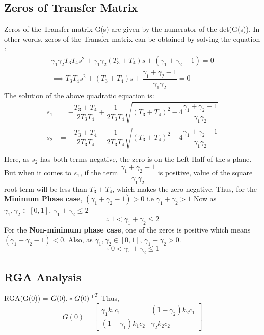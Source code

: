 \documentclass[10pt,a4paper, twocolumn]{article}
\begin{document}
\subsection{Zeros of Transfer Matrix}
Zeros of the Transfer matrix G(s) are given by the numerator of the det(G(s)). In other words, zeros of the Transfer matrix can be obtained by solving the equation :
\begin{align*}
\gamma_1 \gamma_2 T_3 T_4 s^2 + \gamma_1 \gamma_2(T_3 + T_4) s + (\gamma_1 + \gamma_2 - 1) = 0 \\
\implies T_3 T_4 s^2 + (T_3 + T_4) s + \dfrac{\gamma_1 + \gamma_2 - 1}{\gamma_1 \gamma_2} = 0
\end{align*}
The solution of the above quadratic equation is:
\begin{align*}
  s_1 &= -\dfrac{T_3 + T_4}{2 T_3 T_4} + \dfrac{1}{2 T_3 T_4} \sqrt{(T_3 + T_4)^2 - 4 \dfrac{\gamma_1 + \gamma_2 - 1}{\gamma_1 \gamma_2}} \\
  s_2 &= -\dfrac{T_3 + T_4}{2 T_3 T_4} - \dfrac{1}{2 T_3 T_4} \sqrt{(T_3 + T_4)^2 - 4 \dfrac{\gamma_1 + \gamma_2 - 1}{\gamma_1 \gamma_2}} \\
\end{align*}
Here, as $s_2$ has both terms negative, the zero is on the Left Half of the s-plane. But when it comes to $s_1$, if the term $\dfrac{\gamma_1 + \gamma_2 - 1}{\gamma_1 \gamma_2}$ is positive, value of the square root term will be less than $T_3 + T_4$, which makes the zero negative. Thus, for the \textbf{Minimum Phase case}, $(\gamma_1 + \gamma_2 - 1) > 0$ i.e $\gamma_1 + \gamma_2 > 1$ Now as $\gamma_1,\gamma_2 \in [0,1]$, $\gamma_1 + \gamma_2 \leq 2$
\begin{equation*}
\therefore \ 1 < \gamma_1 + \gamma_2 \leq 2
\end{equation*}
For the \textbf{Non-minimum phase case}, one of the zeros is positive which means $(\gamma_1 + \gamma_2 - 1) < 0$. Also, as $\gamma_1,\gamma_2 \in [0,1]$, $\gamma_1 + \gamma_2 > 0$.
\begin{equation*}
\therefore \ 0 < \gamma_1 + \gamma_2 \leq 1
\end{equation*}
\subsection{RGA Analysis}
RGA(G(0)) = $G(0) .* G(0)\textsuperscript{-1}^T$
Thus,
\[
G(0) =
\begin{bmatrix}
  \gamma_1 k_1 c_1 & (1-\gamma_2)k_2 c_1 \\
  (1-\gamma_1) k_1 c_2 & \gamma_2 k_2 c_2
\end{bmatrix}
\]
\end{document}
